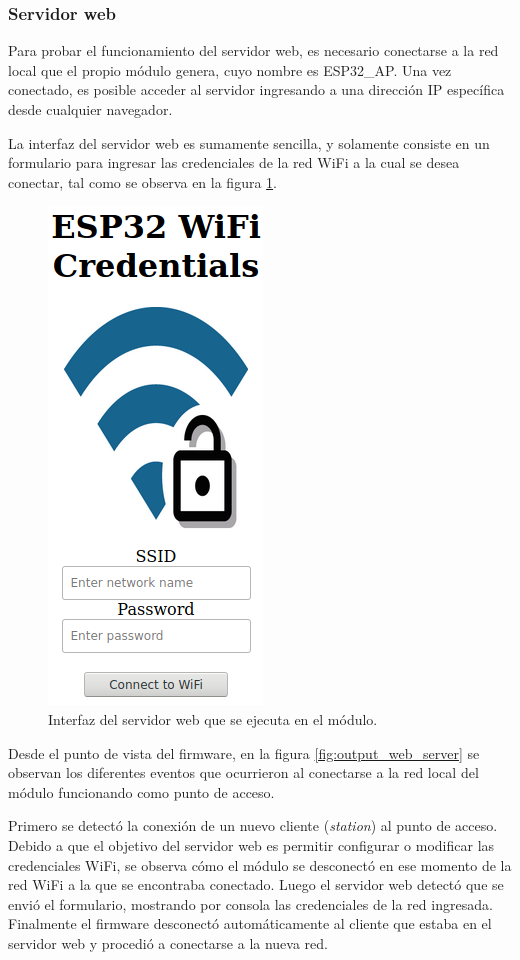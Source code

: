 \subsubsection{Servidor web}

Para probar el funcionamiento del servidor web, es necesario conectarse a la red local que el propio módulo genera, cuyo nombre es ESP32\_AP. Una vez conectado, es posible acceder al servidor ingresando a una dirección IP específica desde cualquier navegador.

La interfaz del servidor web es sumamente sencilla, y solamente consiste en un formulario para ingresar las credenciales de la red WiFi a la cual se desea conectar, tal como se observa en la figura \ref{fig:web_server_interface}.

\begin{figure}[h]
\centering
\includegraphics[scale=0.5]{./Figures/web_server_interface.png}
\caption{Interfaz del servidor web que se ejecuta en el módulo.}
\label{fig:web_server_interface}
\end{figure}

Desde el punto de vista del firmware, en la figura \ref{fig:output_web_server} se observan los diferentes eventos que ocurrieron al conectarse a la red local del módulo funcionando como punto de acceso.

Primero se detectó la conexión de un nuevo cliente (\emph{station}) al punto de acceso. Debido a que el objetivo del servidor web es permitir configurar o modificar las credenciales WiFi, se observa cómo el módulo se desconectó en ese momento de la red WiFi a la que se encontraba conectado. Luego el servidor web detectó que se envió el formulario, mostrando por consola las credenciales de la red ingresada. Finalmente el firmware desconectó automáticamente al cliente que estaba en el servidor web y procedió a conectarse a la nueva red.

